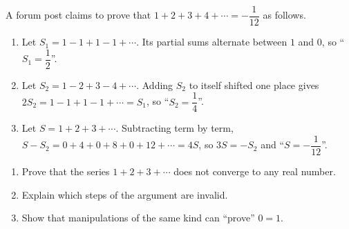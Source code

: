 A forum post claims to prove that \(1+2+3+4+\cdots=-\dfrac{1}{12}\) as follows.
\begin{enumerate}
\item Let \(S_1=1-1+1-1+\cdots\). Its partial sums alternate between \(1\) and \(0\), so ``\(S_1=\dfrac{1}{2}\)''.
\item Let \(S_2=1-2+3-4+\cdots\). Adding \(S_2\) to itself shifted one place gives \(2S_2=1-1+1-1+\cdots=S_1\), so ``\(S_2=\dfrac{1}{4}\)''.
\item Let \(S=1+2+3+\cdots\). Subtracting term by term, \(S-S_2=0+4+0+8+0+12+\cdots=4S\), so \(3S=-S_2\) and ``\(S=-\dfrac{1}{12}\)''.
\end{enumerate}
\begin{enumerate}
\item[(a)] Prove that the series \(1+2+3+\cdots\) does not converge to any real number.
\item[(b)] Explain which steps of the argument are invalid.
\item[(c)] Show that manipulations of the same kind can ``prove'' \(0=1\).
\end{enumerate}
